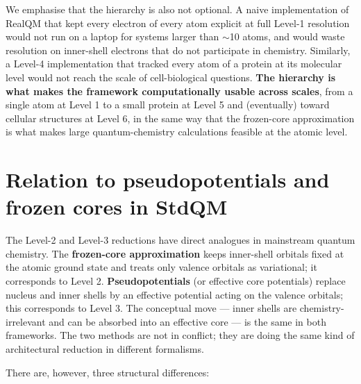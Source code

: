 We emphasise that the hierarchy is also not optional. A naive implementation of RealQM that kept every electron of every atom explicit at full Level-1 resolution would not run on a laptop for systems larger than $\sim$10 atoms, and would waste resolution on inner-shell electrons that do not participate in chemistry. Similarly, a Level-4 implementation that tracked every atom of a protein at its molecular level would not reach the scale of cell-biological questions. \textbf{The hierarchy is what makes the framework computationally usable across scales}, from a single atom at Level 1 to a small protein at Level 5 and (eventually) toward cellular structures at Level 6, in the same way that the frozen-core approximation is what makes large quantum-chemistry calculations feasible at the atomic level.

\section{Relation to pseudopotentials and frozen cores in StdQM}\label{sec:vs-pseudo}

The Level-2 and Level-3 reductions have direct analogues in mainstream quantum chemistry. The \textbf{frozen-core approximation} keeps inner-shell orbitals fixed at the atomic ground state and treats only valence orbitals as variational; it corresponds to Level 2. \textbf{Pseudopotentials} (or effective core potentials) replace nucleus and inner shells by an effective potential acting on the valence orbitals; this corresponds to Level 3. The conceptual move --- inner shells are chemistry-irrelevant and can be absorbed into an effective core --- is the same in both frameworks. The two methods are not in conflict; they are doing the same kind of architectural reduction in different formalisms.

There are, however, three structural differences:

